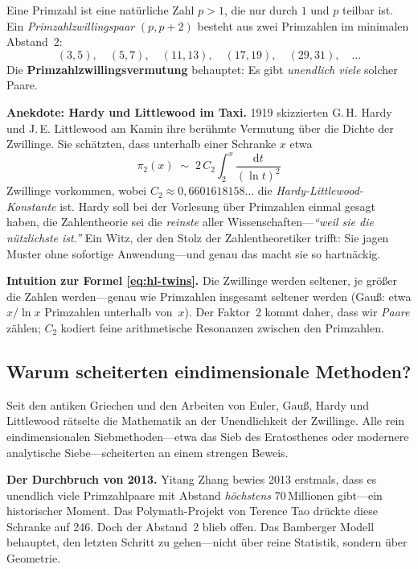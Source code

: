 \documentclass[11pt,a4paper]{article}
\newcommand{\dd}{\mathrm{d}}
\begin{document}
Eine Primzahl ist eine natürliche Zahl $p > 1$, die nur durch $1$ und $p$ teilbar ist. Ein \emph{Primzahlzwillingspaar} $(p, p+2)$ besteht aus zwei Primzahlen im minimalen Abstand~2:
\[
(3,5),\quad (5,7),\quad (11,13),\quad (17,19),\quad (29,31),\quad \ldots
\]
Die \textbf{Primzahlzwillingsvermutung} behauptet: Es gibt \emph{unendlich viele} solcher Paare.

\medskip
\noindent\textbf{Anekdote: Hardy und Littlewood im Taxi.} 1919 skizzierten G.\,H. Hardy und J.\,E. Littlewood am Kamin ihre berühmte Vermutung über die Dichte der Zwillinge. Sie schätzten, dass unterhalb einer Schranke $x$ etwa
\begin{equation}
  \pi_2(x) \;\sim\; 2\,C_2 \int_2^x \frac{\dd t}{(\ln t)^2}
  \label{eq:hl-twins}
\end{equation}
Zwillinge vorkommen, wobei $C_2 \approx 0{,}6601618158\ldots$ die \emph{Hardy-Littlewood-Konstante} ist. Hardy soll bei der Vorlesung über Primzahlen einmal gesagt haben, die Zahlentheorie sei die \emph{reinste} aller Wissenschaften---\emph{``weil sie die nützlichste ist.''} Ein Witz, der den Stolz der Zahlentheoretiker trifft: Sie jagen Muster ohne sofortige Anwendung---und genau das macht sie so hartnäckig.

\medskip
\noindent\textbf{Intuition zur Formel \eqref{eq:hl-twins}.} Die Zwillinge werden seltener, je größer die Zahlen werden---genau wie Primzahlen insgesamt seltener werden (Gauß: etwa $x/\ln x$ Primzahlen unterhalb von~$x$). Der Faktor~2 kommt daher, dass wir \emph{Paare} zählen; $C_2$ kodiert feine arithmetische Resonanzen zwischen den Primzahlen.

\subsection{Warum scheiterten eindimensionale Methoden?}

Seit den antiken Griechen und den Arbeiten von Euler, Gauß, Hardy und Littlewood rätselte die Mathematik an der Unendlichkeit der Zwillinge. Alle rein eindimensionalen Siebmethoden---etwa das Sieb des Eratosthenes oder modernere analytische Siebe---scheiterten an einem strengen Beweis.

\medskip
\noindent\textbf{Der Durchbruch von 2013.} Yitang Zhang bewies 2013 erstmals, dass es unendlich viele Primzahlpaare mit Abstand \emph{höchstens} 70\,Millionen gibt---ein historischer Moment. Das Polymath-Projekt von Terence Tao drückte diese Schranke auf 246. Doch der Abstand~2 blieb offen. Das Bamberger Modell behauptet, den letzten Schritt zu gehen---nicht über reine Statistik, sondern über Geometrie.
\end{document}

